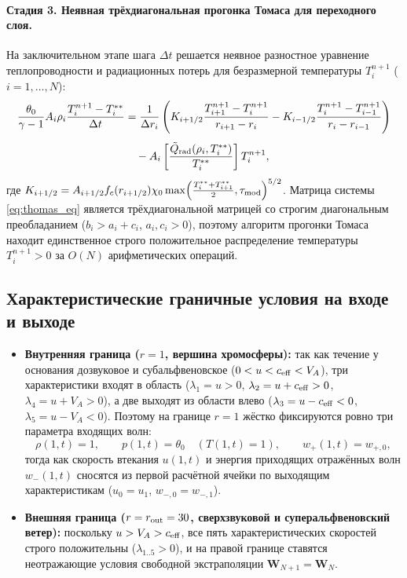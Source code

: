 \documentclass[11pt,a4paper]{article}
\begin{document}
\paragraph{Стадия 3. Неявная трёхдиагональная прогонка Томаса для переходного слоя.}
На заключительном этапе шага $\Delta t$ решается неявное разностное уравнение теплопроводности и радиационных потерь для безразмерной температуры $T_i^{n+1}$ ($i = 1, \dots, N$):
\begin{equation}
\begin{aligned}
\frac{\theta_0}{\gamma-1}A_i\rho_i\frac{T_i^{n+1} - T_i^{**}}{\Delta t} &= \frac{1}{\Delta r_i}\left(K_{i+1/2}\frac{T_{i+1}^{n+1} - T_i^{n+1}}{r_{i+1} - r_i} - K_{i-1/2}\frac{T_i^{n+1} - T_{i-1}^{n+1}}{r_i - r_{i-1}}\right) \\[4pt]
&\quad - A_i\left[\frac{\tilde{Q}_{\rm rad}(\rho_i, T_i^{**})}{T_i^{**}}\right]T_i^{n+1},
\end{aligned}
\label{eq:thomas_eq}
\end{equation}
где $K_{i+1/2} = A_{i+1/2} f_c(r_{i+1/2})\chi_0\max\!\left(\frac{T_i^{**} + T_{i+1}^{**}}{2}, \tau_{\rm mod}\right)^{5/2}$. Матрица системы \eqref{eq:thomas_eq} является трёхдиагональной матрицей со строгим диагональным преобладанием ($b_i > a_i + c_i$, $a_i, c_i > 0$), поэтому алгоритм прогонки Томаса находит единственное строго положительное распределение температуры $T_i^{n+1} > 0$ за $O(N)$ арифметических операций.

\subsection{Характеристические граничные условия на входе и выходе}

\begin{itemize}
\item \textbf{Внутренняя граница ($r = 1$, вершина хромосферы):} так как течение у основания дозвуковое и субальфвеновское ($0 < u < c_{\rm eff} < V_A$), три характеристики входят в область ($\lambda_1 = u > 0$, $\lambda_2 = u + c_{\rm eff} > 0$, $\lambda_4 = u + V_A > 0$), а две выходят из области влево ($\lambda_3 = u - c_{\rm eff} < 0$, $\lambda_5 = u - V_A < 0$). Поэтому на границе $r = 1$ жёстко фиксируются ровно три параметра входящих волн:
\[
\rho(1, t) = 1, \qquad p(1, t) = \theta_0 \quad (T(1,t) = 1), \qquad w_+(1, t) = w_{+,0},
\]
тогда как скорость втекания $u(1, t)$ и энергия приходящих отражённых волн $w_-(1, t)$ сносятся из первой расчётной ячейки по выходящим характеристикам ($u_0 = u_1$, $w_{-,0} = w_{-,1}$).
\item \textbf{Внешняя граница ($r = r_{\rm out} = 30$, сверхзвуковой и суперальфвеновский ветер):} поскольку $u > V_A > c_{\rm eff}$, все пять характеристических скоростей строго положительны ($\lambda_{1..5} > 0$), и на правой границе ставятся неотражающие условия свободной экстраполяции $\bm{W}_{N+1} = \bm{W}_N$.
\end{itemize}
\end{document}

